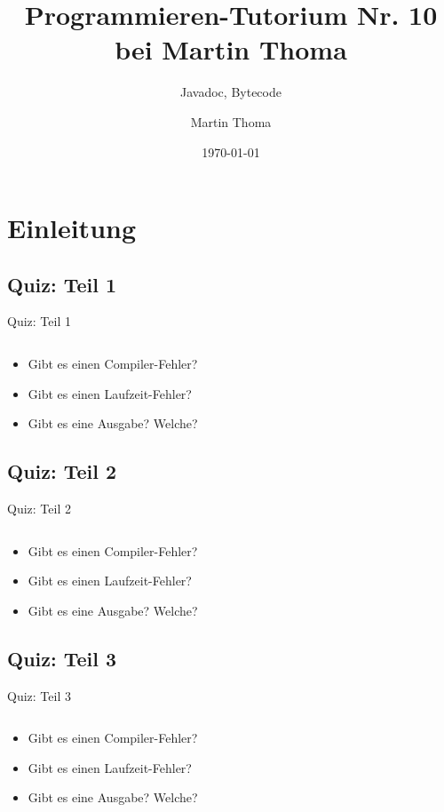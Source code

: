 \documentclass[usepdftitle=false,hyperref={pdfpagelabels=false}]{beamer}
\institute{Fakultät für Informatik}
\newcommand\tutor{Martin Thoma}
\newcommand\tutNR{10}
\newcommand\titleText{Programmieren-Tutorium Nr. \tutNR{} bei \tutor}
\begin{document}
\title{\titleText}
\subtitle{Javadoc, Bytecode}
\author{\tutor}
\date{\today}
\subject{Programmieren}

\frame{\titlepage}


\section{Einleitung}
\subsection{Quiz: Teil 1}
\begin{frame}{Quiz: Teil 1}
    \inputminted[linenos=true, numbersep=5pt, tabsize=4, fontsize=\small, label=Quiz.java, frame=lines]{java}{Quiz-float-1.java}
    \begin{itemize}
        \item Gibt es einen Compiler-Fehler?
        \item Gibt es einen Laufzeit-Fehler?
        \item Gibt es eine Ausgabe? Welche?
    \end{itemize}
\end{frame}

\subsection{Quiz: Teil 2}
\begin{frame}{Quiz: Teil 2}
    \inputminted[linenos=true, numbersep=5pt, tabsize=4, fontsize=\small, label=Quiz.java, frame=lines]{java}{Quiz-float-2.java}
    \begin{itemize}
        \item Gibt es einen Compiler-Fehler?
        \item Gibt es einen Laufzeit-Fehler?
        \item Gibt es eine Ausgabe? Welche?
    \end{itemize}
\end{frame}

\subsection{Quiz: Teil 3}
\begin{frame}{Quiz: Teil 3}
    \inputminted[linenos=true, numbersep=5pt, tabsize=4, fontsize=\small, label=Quiz.java, frame=lines]{java}{Quiz-float-3.java}
    \begin{itemize}
        \item Gibt es einen Compiler-Fehler?
        \item Gibt es einen Laufzeit-Fehler?
        \item Gibt es eine Ausgabe? Welche?
    \end{itemize}
\end{frame}
\end{document}
